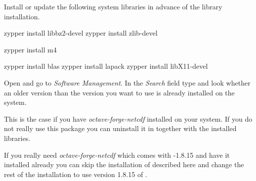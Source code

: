 % 
%               
%          
% 


Install or update the following system libraries in advance of the \protect\marktool{\toolname} library installation.

\begin{code}
zypper install libbz2-devel
zypper install zlib-devel

zypper install m4

zypper install blas
zypper install lapack
zypper install libX11-devel
\end{code}

\label{sec:System_Libraries_not_to_be_installed_yet}

Open \marktool{\yastname} and go to \textit{Software Management}. In the \textit{Search} field type \marktool{\hdfname} and look whether an older version than the \marktool{\hdfname} version you want to use is already installed on the system.

This is the case if you have \textit{octave-forge-netcdf} installed on your system. If you do not really use this package you can uninstall it in  \marktool{\yastname} together with the installed \marktool{\hdfname} libraries.

If you really need \textit{octave-forge-netcdf} which comes with \marktool{\hdfname}-1.8.15 and have it installed already you can skip the installation of \marktool{\hdfname} described here and change the rest of the installation to use version 1.8.15 of \marktool{\hdfname}.